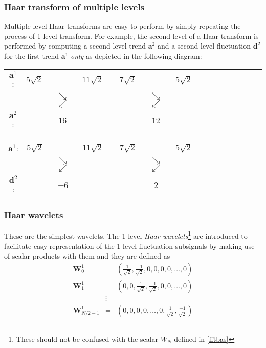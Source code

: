 \documentclass[a4paper,11pt]{report}
\begin{document}
\subsubsection*{Haar transform of multiple levels}
Multiple level Haar transforms are easy to perform by simply repeating the process of 1-level transform. For example, the second level of a Haar transform is performed by computing a second level trend $\mathbf{a}^{2}$ and a second level fluctuation $\mathbf{d}^{2}$ for the first trend $\mathbf{a}^{1}$ \emph{only} as depicted in the following diagram:
\begin{center}
\begin{tabular}{cccccccccccccccc}
$\mathbf{a}^{1}$: & $5\sqrt{2}$ & & $11\sqrt{2}$ & & $7\sqrt{2}$ & & $5\sqrt{2}$   \\
 &   & $\searrow$$\swarrow$ & & & & $\searrow$$\swarrow$ &  \\
$\mathbf{a}^{2}$: & & $16$ & & & & $12$ &    
\end{tabular}
\end{center}

\begin{center}
\begin{tabular}{cccccccccccccccc}
$\mathbf{a}^{1}$: & $5\sqrt{2}$ & & $11\sqrt{2}$ & & $7\sqrt{2}$ & & $5\sqrt{2}$   \\
 &   & $\searrow$$\swarrow$ & & & & $\searrow$$\swarrow$ &  \\
$\mathbf{d}^{2}$: & & $-6$ & & & & $2$ &    
\end{tabular}
\end{center}

\subsubsection{Haar wavelets}
These are the simplest wavelets. The 1-level \emph{Haar wavelets}\footnote{These should not be confused with the scalar $W_{N}$ defined in \ref{fftbas}} are introduced to facilitate easy representation of the 1-level fluctuation subsignals by making use of scalar products with them and they are defined as
\begin{eqnarray}
\mathbf{W}_{0}^{1} & = &\left( \frac{1}{\sqrt{2}},\frac{-1}{\sqrt{2}},0,0,0,0,\ldots,0 \right) \nonumber \\
\mathbf{W}_{1}^{1} & = & \left( 0,0,\frac{1}{\sqrt{2}},\frac{-1}{\sqrt{2}},0,0,\ldots,0 \right) \nonumber \\
	 & \vdots & 	\nonumber \\
\mathbf{W}_{N/2-1}^{1} & = & \left( 0,0,0,0,\ldots,0,\frac{1}{\sqrt{2}},\frac{-1}{\sqrt{2}} \right) 
\end{eqnarray}
\end{document}
